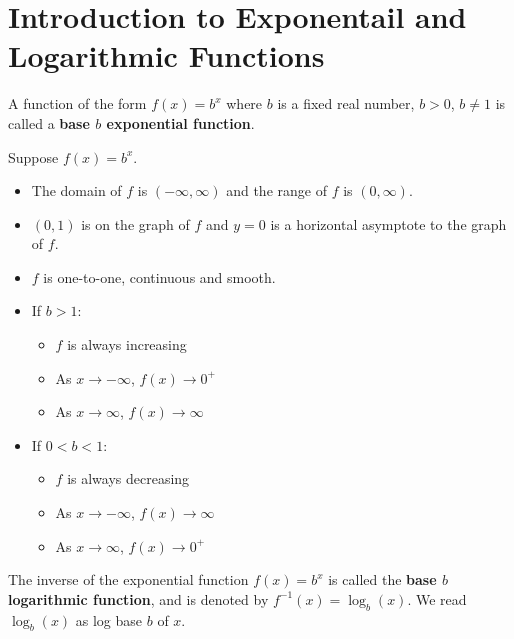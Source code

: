 \section{Introduction to Exponentail and Logarithmic Functions}

\begin{definition}
    A function of the form $f(x) = b^x$ where $b$ is a fixed real number, $b>0$, $b \neq 1$ is called a \textbf{base $b$ exponential function}.
\end{definition}

\begin{theorem}
    Suppose $f(x)=b^x$.
    \begin{itemize}
        \item The domain of $f$ is $(-\infty, \infty)$ and the range of $f$ is $(0, \infty)$.
        \item $(0, 1)$ is on the graph of $f$ and $y=0$ is a horizontal asymptote to the graph of $f$.
        \item $f$ is one-to-one, continuous and smooth.
        \item If $b > 1$:
              \begin{itemize}[label=-]
                  \item $f$ is always increasing
                  \item As $x \to -\infty$, $f(x) \to 0^+$
                  \item As $x \to \infty$, $f(x) \to \infty$
              \end{itemize}
        \item If $0 < b < 1$:
              \begin{itemize}[label=-]
                  \item $f$ is always decreasing
                  \item As $x \to -\infty$, $f(x) \to \infty$
                  \item As $x \to \infty$, $f(x) \to 0^+$
              \end{itemize}
    \end{itemize}
\end{theorem}

\begin{definition}
    The inverse of the exponential function $f(x)=b^x$ is called the \textbf{base $b$ logarithmic function}, and is denoted by $f^{-1}(x)=\log_{b}(x)$. We read $\log_{b}(x)$ as log base $b$ of $x$.
\end{definition}


